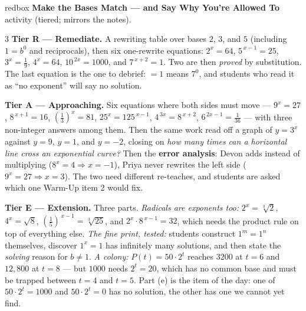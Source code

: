 \documentclass[10pt]{article}
\begin{document}
\begin{skillbox}{redbox}
\textbf{Make the Bases Match --- and Say Why You're Allowed To} activity (tiered; mirrors the notes).
\begin{multicols}{3}
\textbf{Tier R --- Remediate.} A rewriting table over bases $2$, $3$, and $5$ (including $1=b^{0}$ and
reciprocals), then six one-rewrite equations: $2^{x}=64$, $5^{\,x-1}=25$, $3^{x}=\frac19$, $4^{x}=64$,
$10^{\,2x}=1000$, and $7^{\,x+2}=1$. Two are then \emph{proved} by substitution. The last equation is
the one to debrief: $=1$ means $7^{0}$, and students who read it as ``no exponent'' will say no
solution.

\columnbreak
\textbf{Tier A --- Approaching.} Six equations where both sides must move --- $9^{x}=27$,
$8^{\,x+1}=16$, $\left(\frac13\right)^{x}=81$, $25^{x}=125^{\,x-1}$, $4^{\,3x}=8^{\,x+2}$,
$6^{\,2x-1}=\frac1{36}$ --- with three non-integer answers among them. Then the same work read off a
graph of $y=3^{x}$ against $y=9$, $y=1$, and $y=-2$, closing on \emph{how many times can a horizontal
line cross an exponential curve?} Then the \textbf{error analysis}: Devon adds instead of multiplying
($8^{x}=4 \Rightarrow x=-1$), Priya never rewrites the left side ($9^{x}=27\Rightarrow x=3$). The two
need different re-teaches, and students are asked which one Warm-Up item 2 would fix.

\columnbreak
\textbf{Tier E --- Extension.} Three parts. \emph{Radicals are exponents too:} $2^{x}=\sqrt[3]2$,
$4^{x}=\sqrt8$, $\left(\frac15\right)^{\,x-1}=\sqrt[3]{25}$, and $2^{x}\cdot8^{\,x-1}=32$, which needs
the product rule on top of everything else. \emph{The fine print, tested:} students construct
$1^{m}=1^{n}$ themselves, discover $1^{x}=1$ has infinitely many solutions, and then state the
\emph{solving} reason for $b\neq1$. \emph{A colony:} $P(t)=50\cdot2^{t}$ reaches $3200$ at $t=6$ and
$12{,}800$ at $t=8$ --- but $1000$ needs $2^{t}=20$, which has no common base and must be trapped
between $t=4$ and $t=5$. Part (e) is the item of the day: one of $50\cdot2^{t}=1000$ and
$50\cdot2^{t}=0$ has no solution, the other has one we cannot yet find.
\end{multicols}
\end{skillbox}
\end{document}
